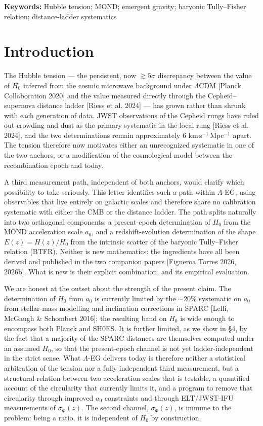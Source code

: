 \documentclass[11pt,a4paper]{article}
\begin{document}
\medskip\noindent\textbf{Keywords:} Hubble tension; MOND; emergent gravity;
baryonic Tully--Fisher relation; distance-ladder systematics

\section{Introduction}

The Hubble tension --- the persistent, now $\gtrsim 5\sigma$ discrepancy
between the value of $H_0$ inferred from the cosmic microwave background
under $\Lambda$CDM [Planck Collaboration 2020] and the value measured
directly through the Cepheid--supernova distance ladder [Riess et al. 2024]
--- has grown rather than shrunk with each generation of data. JWST
observations of the Cepheid rungs have ruled out crowding and dust as the
primary systematic in the local rung [Riess et al. 2024], and the two
determinations remain approximately $6$ km\,s$^{-1}$\,Mpc$^{-1}$ apart. The
tension therefore now motivates either an unrecognized systematic in one of
the two anchors, or a modification of the cosmological model between the
recombination epoch and today.

A third measurement path, independent of both anchors, would clarify which
possibility to take seriously. This letter identifies such a path within
$\Lambda$-EG, using observables that live entirely on galactic scales and
therefore share no calibration systematic with either the CMB or the distance
ladder. The path splits naturally into two orthogonal components: a
present-epoch determination of $H_0$ from the MOND acceleration scale $a_0$,
and a redshift-evolution determination of the shape $E(z) = H(z)/H_0$ from
the intrinsic scatter of the baryonic Tully--Fisher relation (BTFR). Neither
is new mathematics: the ingredients have all been derived and published in
the two companion papers [Figueroa Torres 2026, 2026b]. What is new is their
explicit combination, and its empirical evaluation.

We are honest at the outset about the strength of the present claim. The
determination of $H_0$ from $a_0$ is currently limited by the $\sim 20\%$
systematic on $a_0$ from stellar-mass modelling and inclination corrections
in SPARC [Lelli, McGaugh \& Schombert 2016]; the resulting band on $H_0$ is
wide enough to encompass both Planck and SH0ES. It is further limited, as we
show in \S4, by the fact that a majority of the SPARC distances are
themselves computed under an assumed $H_0$, so that the present-epoch channel
is not yet ladder-independent in the strict sense. What $\Lambda$-EG delivers
today is therefore neither a statistical arbitration of the tension nor a
fully independent third measurement, but a structural relation between two
acceleration scales that is testable, a quantified account of the
circularity that currently limits it, and a program to remove that
circularity through improved $a_0$ constraints and through ELT/JWST-IFU
measurements of $\sigma_\Phi(z)$. The second channel, $\sigma_\Phi(z)$, is
immune to the problem: being a ratio, it is independent of $H_0$ by
construction.
\end{document}
